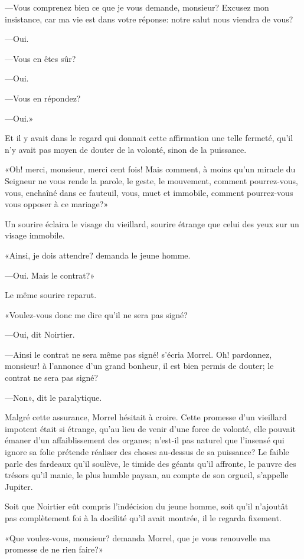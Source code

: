 —Vous comprenez bien ce que je vous demande, monsieur? Excusez mon insistance, car ma vie est dans votre réponse: notre salut nous viendra de vous? 

—Oui. 

—Vous en êtes sûr? 

—Oui.  

—Vous en répondez? 

—Oui.» 

Et il y avait dans le regard qui donnait cette affirmation une telle fermeté, qu'il n'y avait pas moyen de douter de la volonté, sinon de la puissance. 

«Oh! merci, monsieur, merci cent fois! Mais comment, à moins qu'un miracle du Seigneur ne vous rende la parole, le geste, le mouvement, comment pourrez-vous, vous, enchaîné dans ce fauteuil, vous, muet et immobile, comment pourrez-vous vous opposer à ce mariage?» 

Un sourire éclaira le visage du vieillard, sourire étrange que celui des yeux sur un visage immobile. 

«Ainsi, je dois attendre? demanda le jeune homme. 

—Oui. Mais le contrat?» 

Le même sourire reparut. 

«Voulez-vous donc me dire qu'il ne sera pas signé? 

—Oui, dit Noirtier. 

—Ainsi le contrat ne sera même pas signé! s'écria Morrel. Oh! pardonnez, monsieur! à l'annonce d'un grand bonheur, il est bien permis de douter; le contrat ne sera pas signé? 

—Non», dit le paralytique. 

Malgré cette assurance, Morrel hésitait à croire. Cette promesse d'un vieillard impotent était si étrange, qu'au lieu de venir d'une force de volonté, elle pouvait émaner d'un affaiblissement des organes; n'est-il pas naturel que l'insensé qui ignore sa folie prétende réaliser des choses au-dessus de sa puissance? Le faible parle des fardeaux qu'il soulève, le timide des géants qu'il affronte, le pauvre des trésors qu'il manie, le plus humble paysan, au compte de son orgueil, s'appelle Jupiter. 

Soit que Noirtier eût compris l'indécision du jeune homme, soit qu'il n'ajoutât pas complètement foi à la docilité qu'il avait montrée, il le regarda fixement. 

«Que voulez-vous, monsieur? demanda Morrel, que je vous renouvelle ma promesse de ne rien faire?» 

